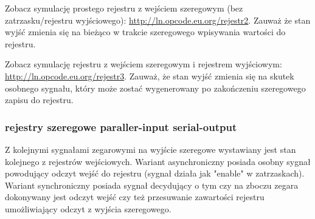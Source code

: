 \documentclass{pdfBooklets}
\begin{document}
Zobacz symulację prostego rejestru z wejściem szeregowym (bez zatrzasku/rejestru wyjściowego): \url{http://ln.opcode.eu.org/rejestr2}.
Zauważ że stan wyjść zmienia się na bieżąco w trakcie szeregowego wpisywania wartości do rejestru.

Zobacz symulację rejestru z wejściem szeregowym i rejestrem wyjściowym: \url{http://ln.opcode.eu.org/rejestr3}.
Zauważ, że stan wyjść zmienia się na skutek osobnego sygnału, który może zostać wygenerowany po zakończeniu szeregowego zapisu do rejestru.

\subsubsection{rejestry szeregowe paraller-input serial-output}
Z kolejnymi sygnałami zegarowymi na wyjście szeregowe wystawiany jest stan kolejnego z rejestrów wejściowych. Wariant asynchroniczny posiada osobny sygnał powodujący odczyt wejść do rejestru (sygnał działa jak "enable" w zatrzaskach). Wariant synchroniczny posiada sygnał decydujący o tym czy na zboczu zegara dokonywany jest odczyt wejść czy też przesuwanie zawartości rejestru umożliwiający odczyt z wyjścia szeregowego.
\end{document}
